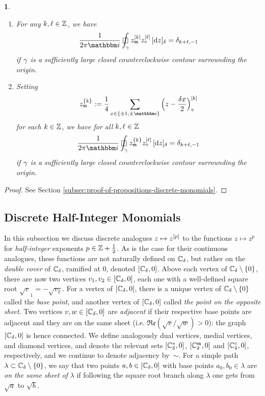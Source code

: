 \documentclass[12pt,oneside,english]{amsart}
\numberwithin{equation}{section}
\numberwithin{figure}{section}
\theoremstyle{plain}
\theoremstyle{plain}
\theoremstyle{plain}
\newtheorem{prop}[thm]{\protect\propositionname}
\theoremstyle{plain}
\theoremstyle{remark}
\theoremstyle{definition}
\theoremstyle{plain}
\theoremstyle{plain}
\numberwithin{thm}{section}
\providecommand{\propositionname}{Proposition}
\providecommand{\propositionname}{Proposition}
\providecommand{\propositionname}{Proposition}
\providecommand{\propositionname}{Proposition}
\begin{document}
\begin{prop}
\begin{enumerate}
origin for $k<0$. 
\item For any $k,\ell\in\mathbb{Z} $, we have
\[ \frac{1}{2\pi \ii } \dcint{\contour}
    \dmon{z_{\mdl}}{k}
    \dmon{z_{\dmd}}{\ell} \, \dd{z}
= \delta_{k+\ell,-1} \]
if $\gamma$ is a sufficiently large closed counterclockwise contour
surrounding the origin.
\item Setting \[ \dmonavg{z_{\mdl}}{k}
:= \frac{1}{4}\sum_{x\in\set{ \pm 1, \pm \ii } }
    \dmon{ \Big( z-\frac{\meshsz x}{2} \Big)_{\dmd}}{k} \]
for each $k \in \mathbb{Z}$, we have for all $k,\ell \in \mathbb{Z}$
\[ \frac{1}{2\pi \ii } \dcint{\contour}
    \dmonavg{z_{\mdl}}{k}
    \dmon{z_{\dmd}}{\ell} \, \dd{z}
= \delta_{k+\ell,-1} \]
if $\gamma$ is a sufficiently large closed counterclockwise contour
surrounding the origin.
\end{enumerate}
\end{prop}
\begin{proof}
See Section \ref{subsec:proof-of-propositions-discrete-monomials}. 
\end{proof}

\subsection{\label{subsec:discrete-half-integer-monomials}Discrete Half-Integer
Monomials}

In this subsection we discuss discrete analogues $z\mapsto {z^{[{p}]}}$
to the functions $z\mapsto z^{p}$ for \emph{half-integer} exponents
$p \in \mathbb{Z} + \frac{1}{2}$. As is the case for their continuous analogues, these 
functions
are not naturally defined on ${\mathbb{C}_{{\delta}}}$, but rather on
the \emph{double cover} of ${\mathbb{C}_{{\delta}}}$, ramified at $0$,
denoted ${\left[ {\mathbb{C}_{{\delta}}},0 \right]}$. Above each vertex of
${\mathbb{C}_{{\delta}}}\setminus\left\{ 0\right\} $, there are now two
vertices $v_{1},v_{2} \in {\left[ {\mathbb{C}_{{\delta}}}, 0 \right]}$, each
one with a well-defined square root $\sqrt{v}_{1}=-\sqrt{v_{2}}$.
For a vertex of ${\left[ {\mathbb{C}_{{\delta}}} , 0 \right]}$, there is a
unique vertex of ${\mathbb{C}_{{\delta}}}\setminus\left\{ 0\right\} $
called the \emph{base point}, and another vertex of ${\left[  {\mathbb{C}_{{\delta}}} , 0  \right]}$
called \emph{the point on the opposite sheet}. Two vertices 
$v,w \in {\left[  {\mathbb{C}_{{\delta}}}, 0  \right]}$
are \emph{adjacent} if their respective base points are adjacent
and they are on the same sheet
(i.e. $\Re\mathfrak{e}\left(\sqrt{v}/\sqrt{w}\right)>0$):
the graph ${\left[  {\mathbb{C}_{{\delta}}} , 0  \right]}$ is hence connected.
We define analogously dual vertices, medial vertices, and diamond
vertices, and denote the relevant sets ${\left[  {\mathbb{C}_{{\delta}}^*} , 0  \right]}$,
${\left[ {\mathbb{C}_{{\delta}}^{\mathfrak{m}}}, 0 \right]}$ and 
${\left[ {\mathbb{C}_{{\delta}}^{\diamond}}, 0 \right]}$,
respectively, and we continue to denote adjacency by~$\sim$.
For a simple path
$\lambda \subset {\mathbb{C}_{{\delta}}} \setminus \left\{ 0 \right\} $,
we say that two points $a,b \in {\left[ {\mathbb{C}_{{\delta}}}, 0 \right]}$
with base points $a_{0},b_{0}\in\lambda$ are \emph{on the same sheet}
\emph{of} $\lambda$ if following the square root branch along $\lambda$
one gets from $\sqrt{a}$ to $\sqrt{b}$.
\end{document}
